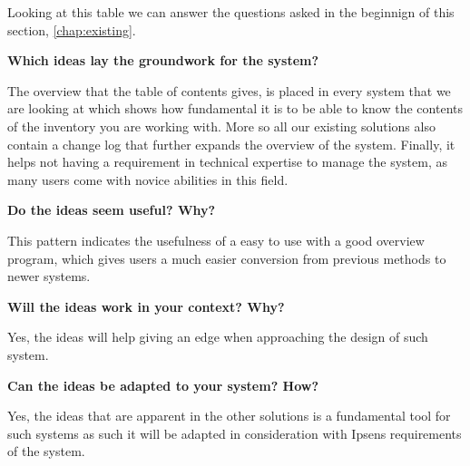 
Looking at this table we can answer the questions asked in the beginnign of this section, \cref{chap:existing}.

\textbf{Which ideas lay the groundwork for the system?}

The overview that the table of contents gives, is placed in every system that we are looking at which shows how fundamental it is to be able to know the contents of the inventory you are working with.
More so all our existing solutions also contain a change log that further expands the overview of the system. Finally, it helps not having a requirement in technical expertise to manage the system, as many users come with novice abilities in this field.

\textbf{Do the ideas seem useful? Why?}

This pattern indicates the usefulness of a easy to use with a good overview program, which gives users a much easier conversion from previous methods to newer systems.

\textbf{Will the ideas work in your context? Why?}

Yes, the ideas will help giving an edge when approaching the design of such system.

\textbf{Can the ideas be adapted to your system? How?}

Yes, the ideas that are apparent in the other solutions is a fundamental tool for such systems as such it will be adapted in consideration with Ipsens requirements of the system.


